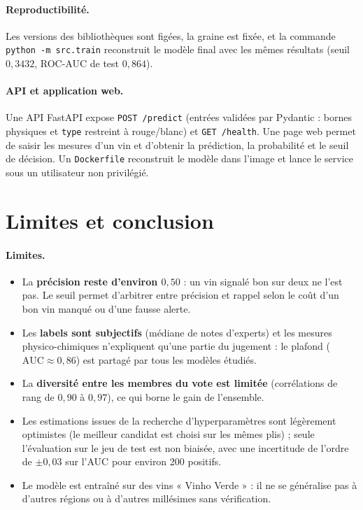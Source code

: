 \documentclass[11pt,a4paper]{article}
\begin{document}
\paragraph{Reproductibilité.}
Les versions des bibliothèques sont figées, la graine est fixée, et la commande \texttt{python -m src.train} reconstruit le modèle final avec les mêmes résultats (seuil $0{,}3432$, ROC-AUC de test $0{,}864$).

\paragraph{API et application web.}
Une API FastAPI expose \texttt{POST /predict} (entrées validées par Pydantic : bornes physiques et \texttt{type} restreint à rouge/blanc) et \texttt{GET /health}. Une page web permet de saisir les mesures d'un vin
et d'obtenir la prédiction, la probabilité et le seuil de décision. Un \texttt{Dockerfile} reconstruit le modèle dans l'image et lance le service sous un utilisateur non privilégié.

\section{Limites et conclusion}

\paragraph{Limites.}
\begin{itemize}
  \item La \textbf{précision reste d'environ $0{,}50$} : un vin signalé bon sur deux ne l'est pas. Le seuil permet d'arbitrer entre précision et rappel selon le coût d'un bon vin manqué ou d'une fausse alerte.
  \item Les \textbf{labels sont subjectifs} (médiane de notes d'experts) et les mesures physico-chimiques n'expliquent qu'une partie du jugement : le plafond ($\text{AUC} \approx 0{,}86$) est partagé par tous les modèles étudiés.
  \item La \textbf{diversité entre les membres du vote est limitée} (corrélations de rang de $0{,}90$ à $0{,}97$), ce qui borne le gain de l'ensemble.
  \item Les estimations issues de la recherche d'hyperparamètres sont légèrement optimistes (le meilleur candidat est choisi sur les mêmes plis) ; seule l'évaluation sur le jeu de test est non biaisée,
        avec une incertitude de l'ordre de $\pm 0{,}03$ sur l'AUC pour environ 200 positifs.
  \item Le modèle est entraîné sur des vins « Vinho Verde » : il ne se généralise pas à d'autres régions ou à d'autres millésimes sans vérification.
\end{itemize}
\end{document}
